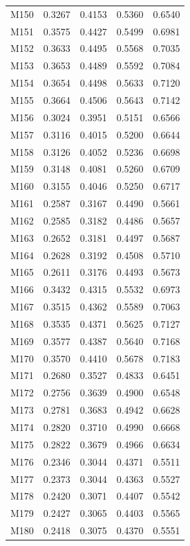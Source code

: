 \begin{longtable}{lrrrr}
M150 & 0.3267 & 0.4153 & 0.5360 & 0.6540 \\
M151 & 0.3575 & 0.4427 & 0.5499 & 0.6981 \\
M152 & 0.3633 & 0.4495 & 0.5568 & 0.7035 \\
M153 & 0.3653 & 0.4489 & 0.5592 & 0.7084 \\
M154 & 0.3654 & 0.4498 & 0.5633 & 0.7120 \\
M155 & 0.3664 & 0.4506 & 0.5643 & 0.7142 \\
M156 & 0.3024 & 0.3951 & 0.5151 & 0.6566 \\
M157 & 0.3116 & 0.4015 & 0.5200 & 0.6644 \\
M158 & 0.3126 & 0.4052 & 0.5236 & 0.6698 \\
M159 & 0.3148 & 0.4081 & 0.5260 & 0.6709 \\
M160 & 0.3155 & 0.4046 & 0.5250 & 0.6717 \\
M161 & 0.2587 & 0.3167 & 0.4490 & 0.5661 \\
M162 & 0.2585 & 0.3182 & 0.4486 & 0.5657 \\
M163 & 0.2652 & 0.3181 & 0.4497 & 0.5687 \\
M164 & 0.2628 & 0.3192 & 0.4508 & 0.5710 \\
M165 & 0.2611 & 0.3176 & 0.4493 & 0.5673 \\
M166 & 0.3432 & 0.4315 & 0.5532 & 0.6973 \\
M167 & 0.3515 & 0.4362 & 0.5589 & 0.7063 \\
M168 & 0.3535 & 0.4371 & 0.5625 & 0.7127 \\
M169 & 0.3577 & 0.4387 & 0.5640 & 0.7168 \\
M170 & 0.3570 & 0.4410 & 0.5678 & 0.7183 \\
M171 & 0.2680 & 0.3527 & 0.4833 & 0.6451 \\
M172 & 0.2756 & 0.3639 & 0.4900 & 0.6548 \\
M173 & 0.2781 & 0.3683 & 0.4942 & 0.6628 \\
M174 & 0.2820 & 0.3710 & 0.4990 & 0.6668 \\
M175 & 0.2822 & 0.3679 & 0.4966 & 0.6634 \\
M176 & 0.2346 & 0.3044 & 0.4371 & 0.5511 \\
M177 & 0.2373 & 0.3044 & 0.4363 & 0.5527 \\
M178 & 0.2420 & 0.3071 & 0.4407 & 0.5542 \\
M179 & 0.2427 & 0.3065 & 0.4403 & 0.5565 \\
M180 & 0.2418 & 0.3075 & 0.4370 & 0.5551 \\

\end{longtable}
